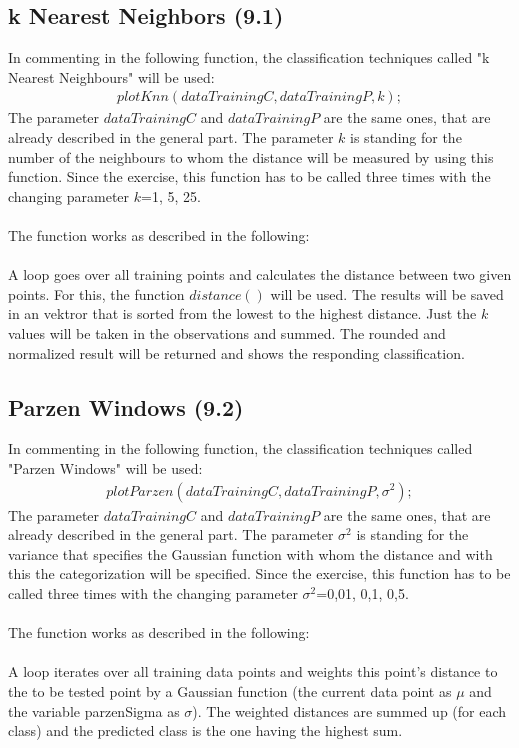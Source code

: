 \documentclass[a4paper,headings=small]{scrartcl}
\begin{document}
\subsection{k Nearest Neighbors (9.1)}
In commenting in the following function, the classification techniques called "k Nearest Neighbours" will be used:
\begin{align}
plotKnn(dataTrainingC, dataTrainingP, k);
\end{align}
The parameter $dataTrainingC$ and $dataTrainingP$ are the same ones, that are already described in the general part. The parameter $k$ is standing for the number of the neighbours to whom the distance will be measured by using this function.
Since the exercise, this function has to be called three times with the changing parameter $k$=1, 5, 25.\\
\\
The function works as described in the following:\\
\\
A loop goes over all training points and calculates the distance between two given points. For this, the function $distance()$ will be used. The results will be saved in an vektror that is sorted from the lowest to the highest distance. Just the $k$ values will be taken in the observations and summed. The rounded and normalized result will be returned and shows the responding classification.
\subsection{Parzen Windows (9.2)}
In commenting in the following function, the classification techniques called "Parzen Windows" will be used:\\
\begin{align}
plotParzen(dataTrainingC, dataTrainingP, \sigma^2);
\end{align}
The parameter $dataTrainingC$ and $dataTrainingP$ are the same ones, that are already described in the general part. The parameter $\sigma^2$ is standing for the variance that specifies the Gaussian function with whom the distance and with this the categorization will be specified.
Since the exercise, this function has to be called three times with the changing parameter $\sigma^2$=0,01, 0,1, 0,5.\\
\\
The function works as described in the following:\\
\\
A loop iterates over all training data points and weights this point's distance to the to be tested point by a Gaussian function (the current data point as $\mu$ and the variable parzenSigma as $\sigma$). The weighted distances are summed up (for each class) and the predicted class is the one having the highest sum.
\\
\end{document}

